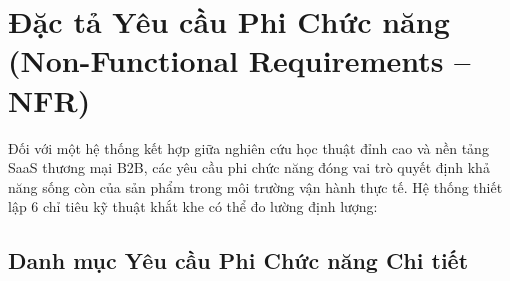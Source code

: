 \section{Đặc tả Yêu cầu Phi Chức năng (Non-Functional Requirements -- NFR)}
\label{sec:yeu_cau_phi_chuc_nang}

Đối với một hệ thống kết hợp giữa nghiên cứu học thuật đỉnh cao và nền tảng SaaS thương mại B2B, các yêu cầu phi chức năng đóng vai trò quyết định khả năng sống còn của sản phẩm trong môi trường vận hành thực tế. Hệ thống thiết lập 6 chỉ tiêu kỹ thuật khắt khe có thể đo lường định lượng:

\subsection{Danh mục Yêu cầu Phi Chức năng Chi tiết}
\label{subsec:nfr_list}

